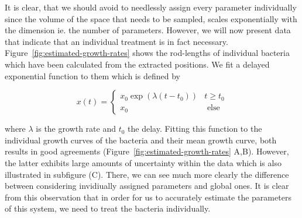 \documentclass{article}
\begin{document}
It is clear, that we should avoid to needlessly assign every parameter individually since the volume
of the space that needs to be sampled, scales exponentially with the dimension ie. the number of
parameters.
However, we will now present data that indicate that an individual treatment is in fact necessary.
Figure~\ref{fig:estimated-growth-rates} shows the rod-lengths of individual bacteria which have been
calculated from the extracted positions.
We fit a delayed exponential function to them which is defined by

\begin{equation}
    x(t) =
    \left\{\begin{array}{ll}
            x_0 \exp(\lambda (t-t_0)) & t\geq t_0\\
            x_0 & \text{ else}
    \end{array}\right.
\end{equation}

where $\lambda$ is the growth rate and $t_0$ the delay.
Fitting this function to the individual growth curves of the bacteria and their mean growth curve,
both results in good agreements (Figure~\ref{fig:estimated-growth-rates} A,B).
However, the latter exhibits large amounts of uncertainty within the data which is also illustrated
in subfigure (C).
There, we can see much more clearly the difference between considering invidiually assigned
parameters and global ones.
It is clear from this observation that in order for us to accurately estimate the parameters of this
system, we need to treat the bacteria individually.

\end{document}
